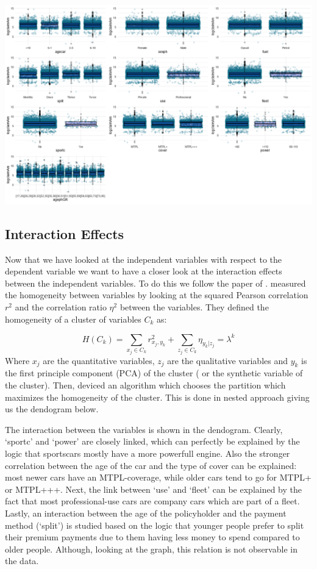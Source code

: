 \documentclass[
  12pt,
]{article}
\begin{document}
\includegraphics[width=1\textwidth,height=\textheight]{Severity_Analysis/plots/exploratory/barplots.png}

\hypertarget{interaction-effects}{%
\subsection{Interaction Effects}\label{interaction-effects}}

Now that we have looked at the independent variables with respect to the
dependent variable we want to have a closer look at the interaction
effects between the independent variables. To do this we follow the
paper of \citet{chavent2011clustofvar}. \citet{chavent2011clustofvar}
measured the homogeneity between variables by looking at the squared
Pearson correlation \(r^2\) and the correlation ratio \(\eta^2\) between
the variables. They defined the homogeneity of a cluster of variables
\(C_k\) as:

\[ H(C_k) = \sum_{x_j \in C_k} r^2_{x_j,y_k} + \sum_{z_j \in  C_k} \eta_{y_k|z_j} = \lambda^k\]
Where \(x_j\) are the quantitative variables, \(z_j\) are the
qualitative variables and \(y_k\) is the first principle component (PCA)
of the cluster ( or the synthetic variable of the cluster). Then,
\citet{chavent2011clustofvar} deviced an algorithm which chooses the
partition which maximizes the homogeneity of the cluster. This is done
in nested approach giving us the dendogram below.

The interaction between the variables is shown in the dendogram.
Clearly, `sportc' and `power' are closely linked, which can perfectly be
explained by the logic that sportscars mostly have a more powerfull
engine. Also the stronger correlation between the age of the car and the
type of cover can be explained: most newer cars have an MTPL-coverage,
while older cars tend to go for MTPL+ or MTPL+++. Next, the link between
`use' and `fleet' can be explained by the fact that most
professional-use cars are company cars which are part of a fleet.
Lastly, an interaction between the age of the policyholder and the
payment method (`split') is studied based on the logic that younger
people prefer to split their premium payments due to them having less
money to spend compared to older people. Although, looking at the graph,
this relation is not observable in the data.
\end{document}
